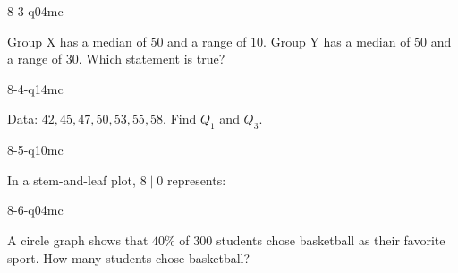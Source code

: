 \begin{practiceQuestion}{8-3-q04}{mc}
\begin{questionText}
Group X has a median of $50$ and a range of $10$. Group Y has a median of $50$ and a range of $30$. Which statement is true?
\end{questionText}
\end{practiceQuestion}

\begin{practiceQuestion}{8-4-q14}{mc}
\begin{questionText}
Data: $42, 45, 47, 50, 53, 55, 58$. Find $Q_1$ and $Q_3$.
\end{questionText}
\end{practiceQuestion}

\begin{practiceQuestion}{8-5-q10}{mc}
\begin{questionText}
In a stem-and-leaf plot, $8 \mid 0$ represents:
\end{questionText}
\end{practiceQuestion}

\begin{practiceQuestion}{8-6-q04}{mc}
\begin{questionText}
A circle graph shows that $40\%$ of $300$ students chose basketball as their favorite sport. How many students chose basketball?
\end{questionText}
\end{practiceQuestion}

